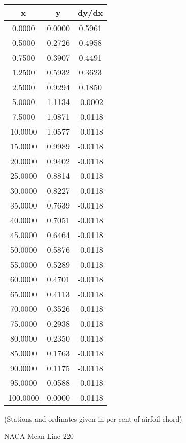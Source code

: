 \documentclass[11pt]{book}
\begin{document}
 \vspace{8mm}
 \begin{tabular}{|c|c|c|}  \hline
 x & y & dy/dx \\
 \hline
0.0000 & 0.0000 & 0.5961 \\
0.5000 & 0.2726 & 0.4958 \\
0.7500 & 0.3907 & 0.4491 \\
1.2500 & 0.5932 & 0.3623 \\
2.5000 & 0.9294 & 0.1850 \\
5.0000 & 1.1134 & -0.0002 \\
7.5000 & 1.0871 & -0.0118 \\
10.0000 & 1.0577 & -0.0118 \\
15.0000 & 0.9989 & -0.0118 \\
20.0000 & 0.9402 & -0.0118 \\
25.0000 & 0.8814 & -0.0118 \\
30.0000 & 0.8227 & -0.0118 \\
35.0000 & 0.7639 & -0.0118 \\
40.0000 & 0.7051 & -0.0118 \\
45.0000 & 0.6464 & -0.0118 \\
50.0000 & 0.5876 & -0.0118 \\
55.0000 & 0.5289 & -0.0118 \\
60.0000 & 0.4701 & -0.0118 \\
65.0000 & 0.4113 & -0.0118 \\
70.0000 & 0.3526 & -0.0118 \\
75.0000 & 0.2938 & -0.0118 \\
80.0000 & 0.2350 & -0.0118 \\
85.0000 & 0.1763 & -0.0118 \\
90.0000 & 0.1175 & -0.0118 \\
95.0000 & 0.0588 & -0.0118 \\
100.0000 & 0.0000 & -0.0118 \\
 \hline
 \end{tabular}
 \vspace{8mm}

(Stations and ordinates given in per cent of airfoil chord)

 \newpage
 \label{ml220}
 \begin{Large}
 NACA Mean Line 220
 \end{Large}
  
\end{document}
